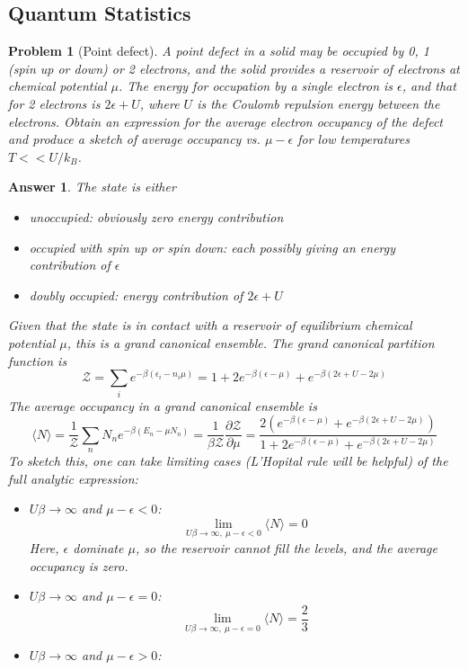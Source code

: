 \documentclass[a4paper]{article}
\newtheorem{ans}{Answer}[section]
\theoremstyle{new}
\newtheorem{qns}{Problem}[section]
\begin{document}
\subsection*{Quantum Statistics}
\begin{qns}[Point defect]
A point defect in a solid may be occupied by 0, 1 (spin up or down) or 2 electrons, and the solid provides a reservoir of electrons at chemical potential $\mu$. The energy for occupation by a single electron is $\epsilon$, and that for 2 electrons is $2\epsilon+U$, where $U$ is the Coulomb repulsion energy between the electrons. Obtain an expression for the average electron occupancy of the defect and produce a sketch of average occupancy vs. $\mu-\epsilon$ for low temperatures $T << U/k_B$.
\end{qns}
\begin{ans}
The state is either
\begin{itemize}
    \item unoccupied: obviously zero energy contribution
    \item occupied with spin up or spin down: each possibly giving an energy contribution of $\epsilon$
    \item doubly occupied: energy contribution of $2\epsilon+U$
\end{itemize}
Given that the state is in contact with a reservoir of equilibrium chemical potential $\mu$, this is a grand canonical ensemble. The grand canonical partition function is
$$\mathcal{Z}=\sum_ie^{-\beta(\epsilon_i-n_i\mu)}=1+2e^{-\beta(\epsilon-\mu)}+e^{-\beta(2\epsilon+U-2\mu)}$$
The average occupancy in a grand canonical ensemble is
$$\langle N\rangle=\frac{1}{\mathcal{Z}}\sum_nN_ne^{-\beta(E_n-\mu N_n)}=\frac{1}{\beta\mathcal{Z}}\frac{\partial\mathcal{Z}}{\partial\mu}=\frac{2(e^{-\beta(\epsilon-\mu)}+e^{-\beta(2\epsilon+U-2\mu)})}{1+2e^{-\beta(\epsilon-\mu)}+e^{-\beta(2\epsilon+U-2\mu)}}$$
To sketch this, one can take limiting cases (L'Hopital rule will be helpful) of the full analytic expression:
\begin{itemize}
    \item $U\beta\rightarrow\infty$ and $\mu-\epsilon<0$:
    $$\lim_{U\beta\rightarrow\infty,~\mu-\epsilon<0}\langle N\rangle=0$$
    Here, $\epsilon$ dominate $\mu$, so the reservoir cannot fill the levels, and the average occupancy is zero.
    \item $U\beta\rightarrow\infty$ and $\mu-\epsilon=0$: 
    $$\lim_{U\beta\rightarrow\infty,~\mu-\epsilon=0}\langle N\rangle=\frac{2}{3}$$
    \item $U\beta\rightarrow\infty$ and $\mu-\epsilon>0$: 

\end{itemize}
\end{ans}
\end{document}
